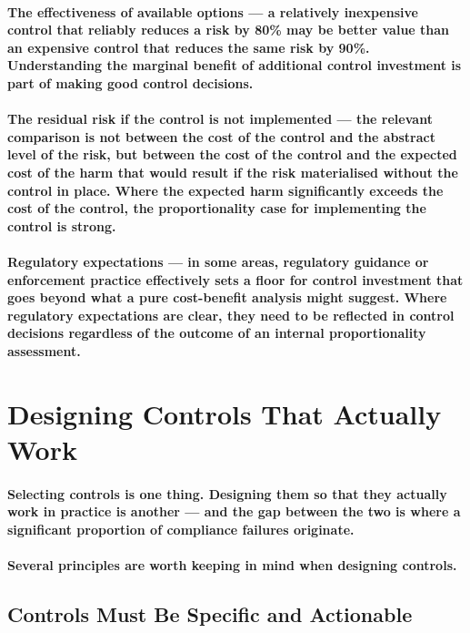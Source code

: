 \paragraph{\textbf{The effectiveness of available options} — a relatively inexpensive control that reliably reduces a risk by 80\% may be better value than an expensive control that reduces the same risk by 90\%. Understanding the marginal benefit of additional control investment is part of making good control decisions.}
\paragraph{The residual risk if the control is not implemented — the relevant comparison is not between the cost of the control and the abstract level of the risk, but between the cost of the control and the expected cost of the harm that would result if the risk materialised without the control in place. Where the expected harm significantly exceeds the cost of the control, the proportionality case for implementing the control is strong.}
\paragraph{\textbf{Regulatory expectations} — in some areas, regulatory guidance or enforcement practice effectively sets a floor for control investment that goes beyond what a pure cost-benefit analysis might suggest. Where regulatory expectations are clear, they need to be reflected in control decisions regardless of the outcome of an internal proportionality assessment.}

\section{Designing Controls That Actually Work}
\paragraph{Selecting controls is one thing. Designing them so that they actually work in practice is another — and the gap between the two is where a significant proportion of compliance failures originate.}
\paragraph{Several principles are worth keeping in mind when designing controls.}

\subsection{Controls Must Be Specific and Actionable}
